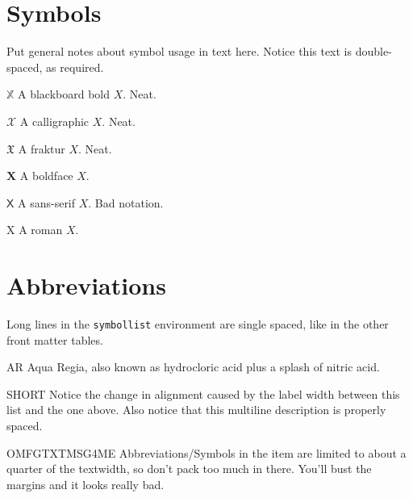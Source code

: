 \abbreviations


\section*{Symbols}

Put general notes about symbol usage in text here.  Notice this text is
double-spaced, as required.

\begin{symbollist}
	\item[$\mathbb{X}$] A blackboard bold $X$.  Neat.
	\item[$\mathcal{X}$] A calligraphic $X$.  Neat.
	\item[$\mathfrak{X}$] A fraktur $X$.  Neat.
	\item[$\mathbf{X}$] A boldface $X$.
	\item[$\mathsf{X}$] A sans-serif $X$. Bad notation.
	\item[$\mathrm{X}$] A roman $X$.
\end{symbollist}

\section*{Abbreviations}

Long lines in the \texttt{symbollist} environment are single spaced, like in
the other front matter tables.

\begin{symbollist}
	\item[AR] Aqua Regia, also known as hydrocloric acid plus a splash of 
	nitric acid.
	\item[SHORT] Notice the change in alignment caused by the label width
	between this list and the one above.  Also notice that this multiline
	description is properly spaced. 
	\item[OMFGTXTMSG4ME] Abbreviations/Symbols in the item are limited to
	about a quarter of the textwidth, so don't pack too much in there.
	You'll bust the margins and it looks really bad.
\end{symbollist}
